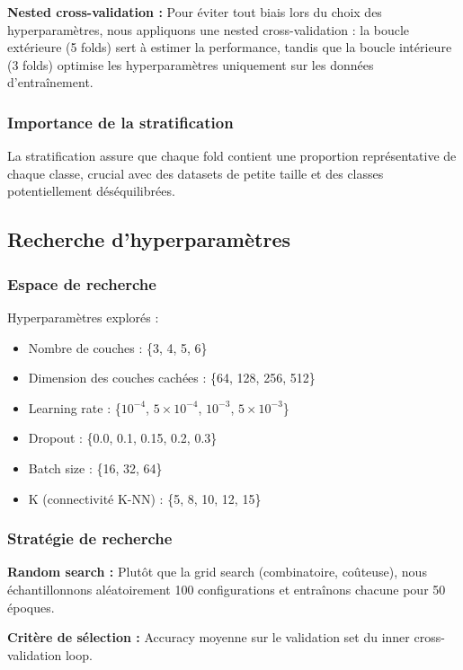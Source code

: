 \textbf{Nested cross-validation :}
Pour éviter tout biais lors du choix des hyperparamètres, nous appliquons une nested cross-validation : la boucle extérieure (5 folds) sert à estimer la performance, tandis que la boucle intérieure (3 folds) optimise les hyperparamètres uniquement sur les données d’entraînement.

\subsubsection{Importance de la stratification}

La stratification assure que chaque fold contient une proportion représentative de chaque classe, crucial avec des datasets de petite taille et des classes potentiellement déséquilibrées.

\subsection{Recherche d'hyperparamètres}

\subsubsection{Espace de recherche}

Hyperparamètres explorés :
\begin{itemize}
    \item Nombre de couches : \{3, 4, 5, 6\}
    \item Dimension des couches cachées : \{64, 128, 256, 512\}
    \item Learning rate : \{$10^{-4}$, $5 \times 10^{-4}$, $10^{-3}$, $5 \times 10^{-3}$\}
    \item Dropout : \{0.0, 0.1, 0.15, 0.2, 0.3\}
    \item Batch size : \{16, 32, 64\}
    \item K (connectivité K-NN) : \{5, 8, 10, 12, 15\}
\end{itemize}

\subsubsection{Stratégie de recherche}

\textbf{Random search :}
Plutôt que la grid search (combinatoire, coûteuse), nous échantillonnons aléatoirement 100 configurations et entraînons chacune pour 50 époques.

\textbf{Critère de sélection :}
Accuracy moyenne sur le validation set du inner cross-validation loop.

